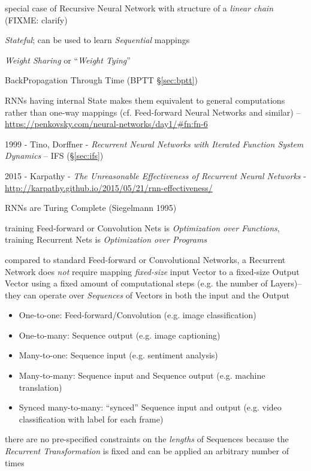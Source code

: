 special case of Recursive Neural Network with structure of a \emph{linear chain}
(FIXME: clarify)

\emph{Stateful}; can be used to learn \emph{Sequential} mappings

\emph{Weight Sharing} or ``\emph{Weight Tying}''

BackPropagation Through Time (BPTT \S\ref{sec:bptt})

RNNs having internal State makes them equivalent to general computations rather
than one-way mappings (cf. Feed-forward Neural Networks and similar)
--\url{https://penkovsky.com/neural-networks/day1/#fn:fn-6}

1999 - Tino, Dorffner - \emph{Recurrent Neural Networks with Iterated Function
  System Dynamics} -- IFS (\S\ref{sec:ifs})

\asterism

2015 - Karpathy - \emph{The Unreasonable Effectiveness of Recurrent Neural
  Networks} -
\url{http://karpathy.github.io/2015/05/21/rnn-effectiveness/}

RNNs are Turing Complete (Siegelmann 1995)

training Feed-forward or Convolution Nets is \emph{Optimization over
  Functions}, training Recurrent Nets is \emph{Optimization over Programs}

compared to standard Feed-forward or Convolutional Networks, a Recurrent Network
does \emph{not} require mapping \emph{fixed-size} input Vector to a fixed-size
Output Vector using a fixed amount of computational steps (e.g. the number of
Layers)-- they can operate over \emph{Sequences} of Vectors in both the input
and the Output
\begin{itemize}
  \item One-to-one: Feed-forward/Convolution (e.g. image classification)
  \item One-to-many: Sequence output (e.g. image captioning)
  \item Many-to-one: Sequence input (e.g. sentiment analysis)
  \item Many-to-many: Sequence input and Sequence output (e.g. machine
    translation)
  \item Synced many-to-many: ``synced'' Sequence input and output (e.g. video
    classification with label for each frame)
\end{itemize}
there are no pre-specified constraints on the \emph{lengths} of Sequences
because the \emph{Recurrent Transformation} is fixed and can be applied an
arbitrary number of times

